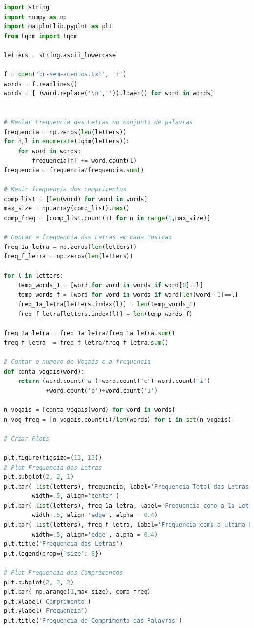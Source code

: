 \begin{lstlisting}[language=Python, frame=lines,basicstyle=\footnotesize, caption={Estatísticas das }, label={lst:isprime}]
import string
import numpy as np
import matplotlib.pyplot as plt
from tqdm import tqdm

letters = string.ascii_lowercase

f = open('br-sem-acentos.txt', 'r')
words = f.readlines()
words = [ (word.replace('\n','')).lower() for word in words]


# Mediar Frequencia das Letras no conjunto de palavras
frequencia = np.zeros(len(letters))
for n,l in enumerate(tqdm(letters)):
    for word in words:
        frequencia[n] += word.count(l)
frequencia = frequencia/frequencia.sum()

# Medir frequencia dos comprimentos
comp_list = [len(word) for word in words]
max_size = np.array(comp_list).max()
comp_freq = [comp_list.count(n) for n in range(1,max_size)]

# Contar a frequencia das Letras em cada Posicao
freq_1a_letra = np.zeros(len(letters))
freq_f_letra = np.zeros(len(letters))

for l in letters:
    temp_words_1 = [word for word in words if word[0]==l]
    temp_words_f = [word for word in words if word[len(word)-1]==l]
    freq_1a_letra[letters.index(l)] = len(temp_words_1)
    freq_f_letra[letters.index(l)] = len(temp_words_f)
    
freq_1a_letra = freq_1a_letra/freq_1a_letra.sum()
freq_f_letra  = freq_f_letra/freq_f_letra.sum()

# Contar o numero de Vogais e a frequencia
def conta_vogais(word):
    return (word.count('a')+word.count('e')+word.count('i')
            +word.count('o')+word.count('u')

n_vogais = [conta_vogais(word) for word in words]
n_vog_freq = [n_vogais.count(i)/len(words) for i in set(n_vogais)]

# Criar Plots

plt.figure(figsize=(13, 13))
# Plot Frequencia das Letras
plt.subplot(2, 2, 1)
plt.bar( list(letters), frequencia, label='Frequencia Total das Letras',
        width=.5, align='center')
plt.bar( list(letters), freq_1a_letra, label='Frequencia como a 1a Letra',
        width=.5, align='edge', alpha = 0.4)
plt.bar( list(letters), freq_f_letra, label='Frequencia como a ultima Letra',
        width=.5, align='edge', alpha = 0.4)
plt.title('Frequencia das Letras')
plt.legend(prop={'size': 8})

# Plot Frequencia dos Comprimentos
plt.subplot(2, 2, 2)
plt.bar( np.arange(1,max_size), comp_freq)
plt.xlabel('Comprimento')
plt.ylabel('Frequencia')
plt.title('Frequencia do Comprimento das Palavras')



\end{lstlisting}
